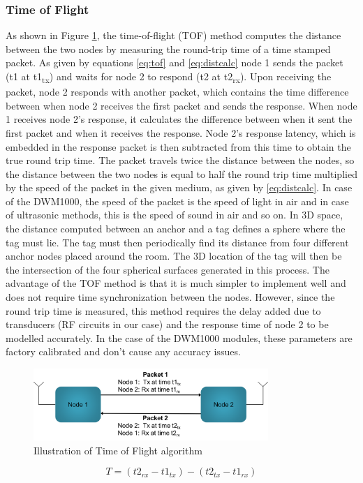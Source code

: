 \documentclass[journal,transmag]{IEEEtran}
\begin{document}
\subsubsection{Time of Flight}
As shown in Figure \ref{fig:tof}, the time-of-flight (TOF) method computes the distance between the two nodes by measuring the round-trip time of a time stamped packet.  As given by equations \ref{eq:tof} and \ref{eq:distcalc} node 1 sends the packet (t1 at t1\textsubscript{tx})  and waits for node 2 to respond (t2 at t2\textsubscript{rx}).  Upon receiving the packet, node 2 responds with another packet, which contains the time difference between when node 2 receives the first packet and sends the response.  When node 1 receives node 2's response, it calculates the difference between when it sent the first packet and when it receives the response.  Node 2's response latency, which is embedded in the response packet is then subtracted from this time to obtain the true round trip time.  The packet travels twice the distance between the nodes, so the distance between the two nodes is equal to half the round trip time multiplied by the speed of the packet in the given medium, as given by \ref{eq:distcalc}.  In case of the DWM1000, the speed of the packet is the speed of light in air and in case of ultrasonic methods, this is the speed of sound in air and so on.  In 3D space, the distance computed between an anchor and a tag defines a sphere where the tag must lie.  The tag must then periodically find its distance from four different anchor nodes placed around the room.  The 3D location of the tag will then be the intersection of the four spherical surfaces generated in this process.  The advantage of the TOF method is that it is much simpler to implement well and does not require time synchronization between the nodes. However, since the round trip time is measured, this method requires the delay added due to transducers (RF circuits in our case) and the response time of node 2 to be modelled accurately.  In the case of the DWM1000 modules, these parameters are factory calibrated and don't cause any accuracy issues.  


\begin{figure}[!h]
\centering
\includegraphics[width=3.5in]{tof.png}
\caption{{Illustration of Time of Flight algorithm}}
\label{fig:tof}
\end{figure}
\begin{equation}
\label{eq:tof}
    T = (t2_{rx} - t1_{tx}) - (t2_{tx} - t1_{rx})
\end{equation}
\end{document}
